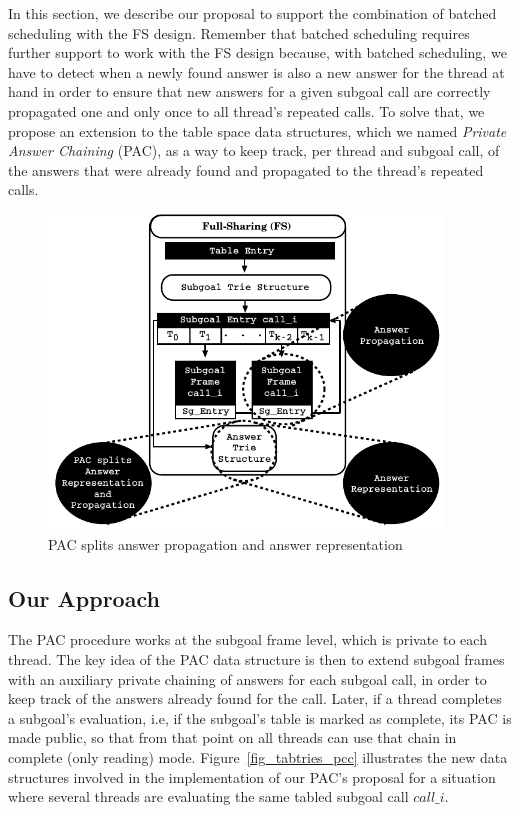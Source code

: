 \documentclass{llncs}
\begin{document}
In this section, we describe our proposal to support the combination
of batched scheduling with the FS design. Remember that batched
scheduling requires further support to work with the FS design
because, with batched scheduling, we have to detect when a newly found
answer is also a new answer for the thread at hand in order to ensure
that new answers for a given subgoal call are correctly propagated one
and only once to all thread’s repeated calls. To solve that, we propose
an extension to the table space data structures, which we named
\emph{Private Answer Chaining} (PAC), as a way to keep track, per
thread and subgoal call, of the answers that were already found and
propagated to the thread's repeated calls.

\begin{figure}[!ht]
\centering
\includegraphics[width=10.5cm]{figures/pcc_key-idea.pdf}
\caption{PAC splits answer propagation and answer representation}
\label{fig_tabtries_pcc_key-idea}
\end{figure}




\subsection{Our Approach}

The PAC procedure works at the subgoal frame level, which is private
to each thread. The key idea of the PAC data structure is then to
extend subgoal frames with an auxiliary private chaining of answers
for each subgoal call, in order to keep track of the answers already
found for the call. Later, if a thread completes a subgoal's
evaluation, i.e, if the subgoal's table is marked as complete, its PAC
is made public, so that from that point on all threads can use that
chain in complete (only reading) mode. Figure~\ref{fig_tabtries_pcc}
illustrates the new data structures involved in the implementation of
our PAC's proposal for a situation where several threads are
evaluating the same tabled subgoal call $call\_i$.
\end{document}
